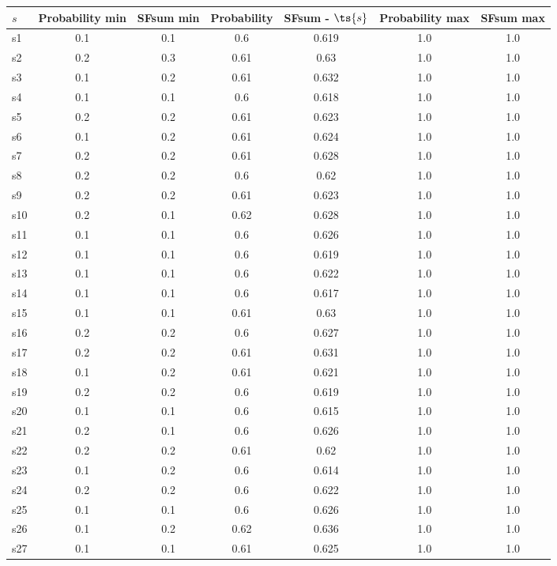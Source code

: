 \documentclass{article}
\begin{document}
\noindent\begin{tabular}{|l|c|c|c|c|c|c|}
\hline
$s$& Probability min & SFsum min & Probability & SFsum - $\ts{s}$ & Probability max & SFsum max\\
\hline
s1 &0.1 & 0.1 & 0.6 & 0.619 & 1.0 & 1.0\\
\hline
s2 &0.2 & 0.3 & 0.61 & 0.63 & 1.0 & 1.0\\
\hline
s3 &0.1 & 0.2 & 0.61 & 0.632 & 1.0 & 1.0\\
\hline
s4 &0.1 & 0.1 & 0.6 & 0.618 & 1.0 & 1.0\\
\hline
s5 &0.2 & 0.2 & 0.61 & 0.623 & 1.0 & 1.0\\
\hline
s6 &0.1 & 0.2 & 0.61 & 0.624 & 1.0 & 1.0\\
\hline
s7 &0.2 & 0.2 & 0.61 & 0.628 & 1.0 & 1.0\\
\hline
s8 &0.2 & 0.2 & 0.6 & 0.62 & 1.0 & 1.0\\
\hline
s9 &0.2 & 0.2 & 0.61 & 0.623 & 1.0 & 1.0\\
\hline
s10 &0.2 & 0.1 & 0.62 & 0.628 & 1.0 & 1.0\\
\hline
s11 &0.1 & 0.1 & 0.6 & 0.626 & 1.0 & 1.0\\
\hline
s12 &0.1 & 0.1 & 0.6 & 0.619 & 1.0 & 1.0\\
\hline
s13 &0.1 & 0.1 & 0.6 & 0.622 & 1.0 & 1.0\\
\hline
s14 &0.1 & 0.1 & 0.6 & 0.617 & 1.0 & 1.0\\
\hline
s15 &0.1 & 0.1 & 0.61 & 0.63 & 1.0 & 1.0\\
\hline
s16 &0.2 & 0.2 & 0.6 & 0.627 & 1.0 & 1.0\\
\hline
s17 &0.2 & 0.2 & 0.61 & 0.631 & 1.0 & 1.0\\
\hline
s18 &0.1 & 0.2 & 0.61 & 0.621 & 1.0 & 1.0\\
\hline
s19 &0.2 & 0.2 & 0.6 & 0.619 & 1.0 & 1.0\\
\hline
s20 &0.1 & 0.1 & 0.6 & 0.615 & 1.0 & 1.0\\
\hline
s21 &0.2 & 0.1 & 0.6 & 0.626 & 1.0 & 1.0\\
\hline
s22 &0.2 & 0.2 & 0.61 & 0.62 & 1.0 & 1.0\\
\hline
s23 &0.1 & 0.2 & 0.6 & 0.614 & 1.0 & 1.0\\
\hline
s24 &0.2 & 0.2 & 0.6 & 0.622 & 1.0 & 1.0\\
\hline
s25 &0.1 & 0.1 & 0.6 & 0.626 & 1.0 & 1.0\\
\hline
s26 &0.1 & 0.2 & 0.62 & 0.636 & 1.0 & 1.0\\
\hline
s27 &0.1 & 0.1 & 0.61 & 0.625 & 1.0 & 1.0\\

\end{tabular}
\end{document}
